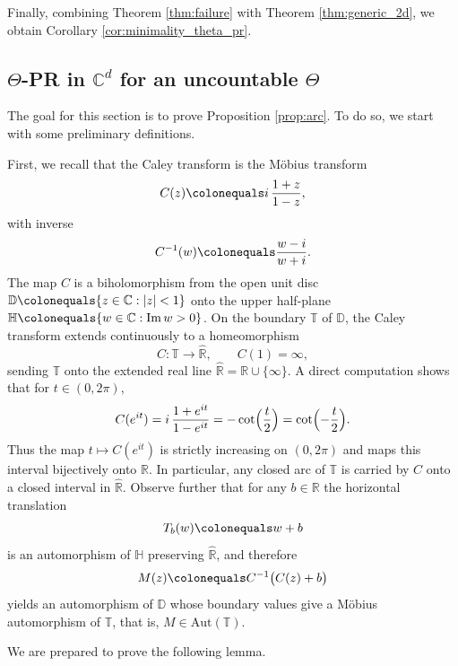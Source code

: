 \documentclass[reqno,a4paper,11pt]{amsart}
\numberwithin{equation}{section}
\def\R{{\mathbb R}}
\def\T{{\mathbb T}}
\def\C{{\mathbb C}}
\newcommand\1{\mathds{1}}
\newcommand{\im}{{\mathrm{Im} \,}}
\begin{document}
Finally, combining Theorem \ref{thm:failure} with Theorem \ref{thm:generic_2d}, we obtain Corollary \ref{cor:minimality_theta_pr}.

\subsection{$\Theta$-PR in $\C^d$ for an uncountable $\Theta$}\label{sec:uncountable}

The goal for this section is to prove Proposition \ref{prop:arc}. To do so, we start with some preliminary definitions.

First, we recall that the Caley transform is the Möbius transform
$$
C(z) \colonequals i\,\frac{1+z}{1-z}, 
$$
with inverse
$$
C^{-1}(w) \colonequals \frac{w-i}{w+i}.
$$
The map $C$ is a biholomorphism from the open unit disc $\mathbb D \colonequals \{z\in\C : |z|<1\}$ onto the upper half-plane $\mathbb H \colonequals \{w\in\C : \im w > 0\}$.
On the boundary $\T$ of $\mathbb D$, the Caley transform extends continuously to a homeomorphism
$$
C : \T \to \hat \R, \qquad C(1) = \infty,
$$
sending $\T$ onto the extended real line $\hat \R = \R \cup \{ \infty \}$.
A direct computation shows that for $t\in(0,2\pi)$,
\begin{equation}\label{eq:cayley-on-circle}
  C(e^{it})
  = i\,\frac{1+e^{it}}{1-e^{it}} = - \cot\Bigl(\frac{t}{2}\Bigr)
  = \cot\Bigl(-\frac{t}{2}\Bigr).
\end{equation}
Thus the map $t \mapsto C(e^{it})$ is strictly increasing on $(0,2\pi)$ and maps this interval bijectively onto $\R$. In particular, any closed arc of $\T$ is carried by $C$ onto a closed interval in $\hat \R$.
Observe further that for any $b \in \R$ the horizontal translation
$$
T_b(w) \colonequals w + b
$$
is an automorphism of $\mathbb H$ preserving $\hat \R$, and therefore
$$
M(z) \colonequals C^{-1}\bigl(C(z) + b\bigr)
$$
yields an automorphism of $\mathbb D$ whose boundary values give a Möbius automorphism of $\T$, that is, $M \in \mathrm{Aut}(\T)$.

We are prepared to prove the following lemma.
\end{document}
